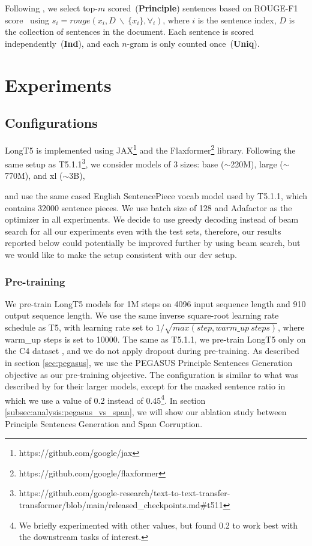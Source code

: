 Following \citet{pegasus}, we select top-$m$ scored~(\textbf{Principle}) sentences based on ROUGE-F1 score~\cite{lin-2004-rouge} using $s_i = rouge(x_i, D~\backslash~\{x_i\}, \forall_i)$,
where $i$ is the sentence index, $D$ is the collection of sentences in the document. Each sentence is scored independently~(\textbf{Ind}), and each $n$-gram is only counted once~(\textbf{Uniq}).

\section{Experiments}\label{sec:experiments}
\subsection{Configurations}
LongT5 is implemented using JAX\footnote{https://github.com/google/jax} and the Flaxformer\footnote{https://github.com/google/flaxformer} library. Following the same setup as T5.1.1\footnote{https://github.com/google-research/text-to-text-transfer-transformer/blob/main/released\_checkpoints.md\#t511}, we consider models of 3 sizes: base ($\sim$220M), large ($\sim$770M), and xl ($\sim$3B), 

and use the same cased English SentencePiece vocab model used by T5.1.1, which contains 32000 sentence pieces. We use batch size of 128 and Adafactor as the optimizer in all experiments. We decide to use greedy decoding instead of beam search for all our experiments even with the test sets, therefore, our results reported below could potentially be improved further by using beam search, but we would like to make the setup consistent with our dev setup.

\subsubsection{Pre-training}
We pre-train LongT5 models for 1M steps on 4096 input sequence length and 910 output sequence length. We use the same inverse square-root learning rate schedule as T5, with learning rate set to $1/\sqrt{max(step, warm\_up\ steps)}$, where warm\_up steps is set to 10000. The same as T5.1.1, we pre-train LongT5 only on the C4 dataset \cite{c4}, and we do not apply dropout during pre-training. As described in section \ref{sec:pegasus}, we use the PEGASUS Principle Sentences Generation objective as our pre-training objective. The configuration is similar to what was described by  for their larger models, except for the masked sentence ratio in which we use a value of 0.2 instead of 0.45\footnote{We briefly experimented with other values, but found 0.2 to work best with the downstream tasks of interest.}. In section \ref{subsec:analysis:pegasus_vs_span}, we will show our ablation study between Principle Sentences Generation and Span Corruption.


